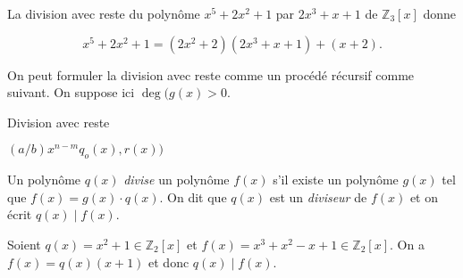 

\begin{example}
  \label{exe:24}
  La division avec reste du polynôme $x^5+2x^2+1$ par $2x^3+x+1$ de $ℤ_3[x]$ donne

  \begin{displaymath}
    x^5+2x^2+1 = (2x^2 +2) (2x^3 + x +1) + (x+2). 
  \end{displaymath}
  
\end{example}

%
On peut formuler la division avec reste comme un procédé récursif comme suivant. On suppose ici  $\deg(g(x)>0$. 

\begin{algorithm}
  \caption{Division avec reste}\label{euclid}
  \begin{algorithmic}[1]
    \State{}
    \Else
    \State \Return $(a/b) x^{n-m} q_o(x),r(x))$  
  \EndIf
  \EndProcedure
\end{algorithmic}
\end{algorithm}



\begin{definition}
  \label{def:32}
  Un polynôme  $q(x)$ \emph{divise} un  polynôme $f(x)$ s'il existe un polynôme $g(x)$ tel que $f(x) = g(x) \cdot q(x)$. On dit que $q(x)$ est un \emph{diviseur} de $f(x)$ et on écrit $q(x) \mid f(x)$. 
\end{definition}


\begin{example}
  \label{exe:41}
  Soient $q(x) = x^2 +1 ∈ℤ_2[x]$ et $ f(x) = x^3 + x^2 - x+1 ∈ ℤ_2[x]$. On a
  $f(x) = q(x) (x+1)$ et donc 
   $q(x) \mid f(x)$. 
\end{example}


